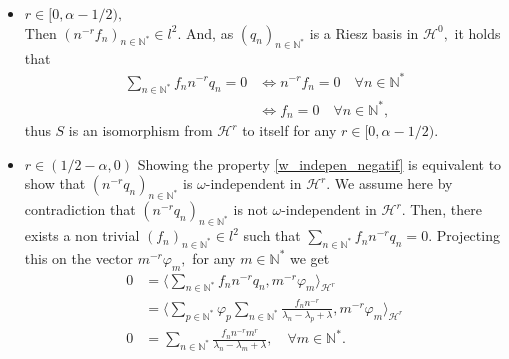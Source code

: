 \documentclass[11pt, dvipsnames]{amsart}
\begin{document}
\begin{itemize}
\item $r\in[0,\alpha-1/2),$ \\
Then $(n^{-r}f_n)_{n\in \mathbb{N}^*}\in l^2.$ And, as $(q_n)_{n\in \mathbb{N}^*}$ is a Riesz basis in ${\mathcal{H}^0},$ it holds that
\begin{align*}
    \sum_{n\in \mathbb{N}^*}f_n n^{-r}q_n=0 &\Leftrightarrow n^{-r}f_n=0\quad  \forall n\in \mathbb{N}^*\\
    &\Leftrightarrow f_n=0\quad  \forall n\in \mathbb{N}^*,
\end{align*}
thus $S$ is an isomorphism from $\mathcal{H}^{r}$ to itself for any $r\in[0,\alpha-1/2).$\\

\item $r\in(1/2-\alpha,0)$
Showing the property \eqref{w_indepen_negatif} is equivalent to show that $(n^{-r}q_n)_{n\in\mathbb{N}^*}$ is $\omega$-independent in $\mathcal{H}^r.$ We assume here by contradiction that $(n^{-r}q_n)_{n\in\mathbb{N}^*}$ is not $\omega$-independent in $\mathcal{H}^r.$ Then, there exists a non trivial $(f_n)_{n\in \mathbb{N}^*}\in l^2$ such that $\sum_{n\in \mathbb{N}^*}f_n n^{-r}q_n=0.$ Projecting this on the vector $m^{-r}\varphi_m,$ for any $m\in \mathbb{N}^*$ we get
\begin{align}
    0&=\langle\sum_{n\in \mathbb{N}^*}f_n n^{-r}q_n,m^{-r}\varphi_m\rangle_{\mathcal{H}^r}\nonumber\\
    &=\langle\sum_{p\in \mathbb{N}^*}\varphi_p\sum_{n\in \mathbb{N}^*}\frac{f_n n^{-r}}{\lambda_n-\lambda_p+\lambda},m^{-r}\varphi_m\rangle_{\mathcal{H}^r}\nonumber\\
    0&=\sum_{n\in \mathbb{N}^*}\frac{f_n n^{-r}m^r}{\lambda_n-\lambda_m+\lambda}, \quad \forall m\in \mathbb{N}^*.\label{sum=0}
\end{align}


\end{itemize}
\end{document}
